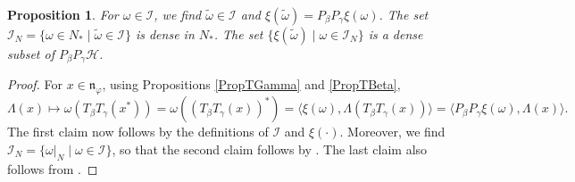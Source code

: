 \documentclass[pdftex]{sigma}
\numberwithin{equation}{section}
\newtheorem{prop}[thm]{Proposition}
\theoremstyle{definition}
\newcommand{\cHil}{\mathcal{H}}
\newcommand{\nphi}{\mathfrak{n}_\varphi}
\begin{document}
\begin{prop}\label{PropDualSqInt}
  For $\omega \in \mathcal{I}$, we find $\tilde{\omega}  \in \mathcal{I}$ and $\xi(\tilde{\omega}  ) = P_\beta P_\gamma \xi(\omega)$. The set $\mathcal{I}_N = \{ \omega \in N_\ast \mid \tilde{\omega} \in \mathcal{I} \}$ is dense in $N_\ast$. The set $\{ \xi(\tilde{\omega}) \mid \omega \in \mathcal{I}_N \}$ is a dense subset of $P_\beta P_\gamma \cHil$.
\end{prop}
\begin{proof}
For $x \in \nphi$, using Propositions \ref{PropTGamma} and \ref{PropTBeta},
\[
 \Lambda(x) \mapsto \omega (T_\beta  T_\gamma(x^\ast)) =   \omega ((T_\beta T_\gamma(x))^\ast) = \langle \xi(\omega), \Lambda(T_\beta T_\gamma(x)) \rangle = \langle P_\beta P_\gamma \xi(\omega), \Lambda(x) \rangle.
\]
The f\/irst claim now follows by the def\/initions of $\mathcal{I}$ and $\xi(\cdot)$. Moreover, we f\/ind $\mathcal{I}_N = \{ \omega\vert_N \mid \omega \in \mathcal{I} \}$, so that the second claim follows by \cite[Lemma 8.5]{KusVae}. The last claim also follows from \cite[Lemma 8.5]{KusVae}.
\end{proof}
\end{document}
